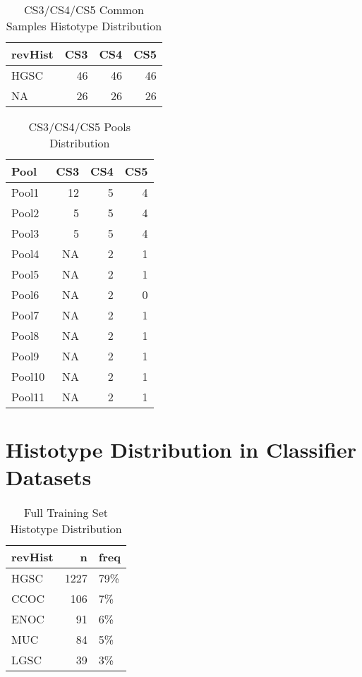 \documentclass[
]{report}
\begin{document}
\begin{table}

\caption{\label{tab:cs345-overlap}CS3/CS4/CS5 Common Samples Histotype Distribution}
\centering
\begin{tabular}[t]{l|r|r|r}
\hline
revHist & CS3 & CS4 & CS5\\
\hline
HGSC & 46 & 46 & 46\\
\hline
NA & 26 & 26 & 26\\
\hline
\end{tabular}
\end{table}

\begin{table}

\caption{\label{tab:cs345-pools}CS3/CS4/CS5 Pools Distribution}
\centering
\begin{tabular}[t]{l|r|r|r}
\hline
Pool & CS3 & CS4 & CS5\\
\hline
Pool1 & 12 & 5 & 4\\
\hline
Pool2 & 5 & 5 & 4\\
\hline
Pool3 & 5 & 5 & 4\\
\hline
Pool4 & NA & 2 & 1\\
\hline
Pool5 & NA & 2 & 1\\
\hline
Pool6 & NA & 2 & 0\\
\hline
Pool7 & NA & 2 & 1\\
\hline
Pool8 & NA & 2 & 1\\
\hline
Pool9 & NA & 2 & 1\\
\hline
Pool10 & NA & 2 & 1\\
\hline
Pool11 & NA & 2 & 1\\
\hline
\end{tabular}
\end{table}

\hypertarget{histotype-distribution-in-classifier-datasets}{%
\section{Histotype Distribution in Classifier Datasets}\label{histotype-distribution-in-classifier-datasets}}

\begin{table}

\caption{\label{tab:train-hist}Full Training Set Histotype Distribution}
\centering
\begin{tabular}[t]{l|r|l}
\hline
revHist & n & freq\\
\hline
HGSC & 1227 & 79\%\\
\hline
CCOC & 106 & 7\%\\
\hline
ENOC & 91 & 6\%\\
\hline
MUC & 84 & 5\%\\
\hline
LGSC & 39 & 3\%\\
\hline
\end{tabular}
\end{table}
\end{document}
